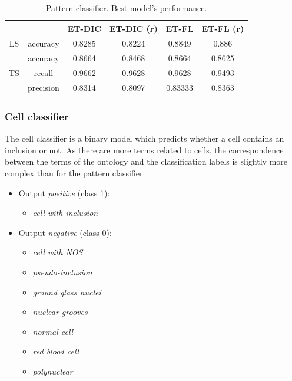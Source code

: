 \begin{table}
	\small
	\center 
	\begin{tabular}{|c|c|cc|cc|}
		\hline
		& & ET-DIC & ET-DIC (r) & ET-FL & ET-FL (r) \\
		\hline
		LS & accuracy & 0.8285 & 0.8224 & 0.8849 & 0.886\\
		\hline
		\multirow{3}{*}{TS} & accuracy & 0.8664 & 0.8468 & 0.8664 & 0.8625\\
		& recall & 0.9662 & 0.9628 & 0.9628 & 0.9493\\
		& precision & 0.8314 & 0.8097 & 0.83333 & 0.8363\\
		\hline
	\end{tabular}
	\caption{Pattern classifier. Best model's performance.}
	\label{tab:pattern_classif_best_scores}
\end{table}

\subsubsection{Cell classifier}
\label{sssec:thyroid_cell_model}

The cell classifier is a binary model which predicts whether a cell contains an inclusion or not. As there are more terms related to cells, the correspondence between the terms of the ontology and the classification labels is slightly more complex than for the pattern classifier:

\begin{itemize}
	\item Output \textit{positive} (class 1): 
	\begin{itemize}
		\item \textit{cell with inclusion}
	\end{itemize}
	\item Output \textit{negative} (class 0): 
	\begin{itemize}
		\item \textit{cell with NOS}
		\item \textit{pseudo-inclusion}
		\item \textit{ground glass nuclei}
		\item \textit{nuclear grooves}
		\item \textit{normal cell}
		\item \textit{red blood cell}
		\item \textit{polynuclear}
	\end{itemize}
\end{itemize}

